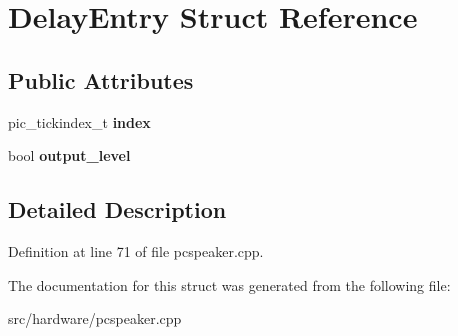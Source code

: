\hypertarget{structDelayEntry}{\section{Delay\-Entry Struct Reference}
\label{structDelayEntry}
}
\subsection*{Public Attributes}
\begin{DoxyCompactItemize}
\item 
\hypertarget{structDelayEntry_a5fb632614c01015f4ed099ffb9d65668}{pic\-\_\-tickindex\-\_\-t {\bfseries index}}\label{structDelayEntry_a5fb632614c01015f4ed099ffb9d65668}

\item 
\hypertarget{structDelayEntry_aec0e84ff03d91c54149675eb9d765985}{bool {\bfseries output\-\_\-level}}\label{structDelayEntry_aec0e84ff03d91c54149675eb9d765985}

\end{DoxyCompactItemize}


\subsection{Detailed Description}


Definition at line 71 of file pcspeaker.\-cpp.



The documentation for this struct was generated from the following file\-:\begin{DoxyCompactItemize}
\item 
src/hardware/pcspeaker.\-cpp\end{DoxyCompactItemize}
